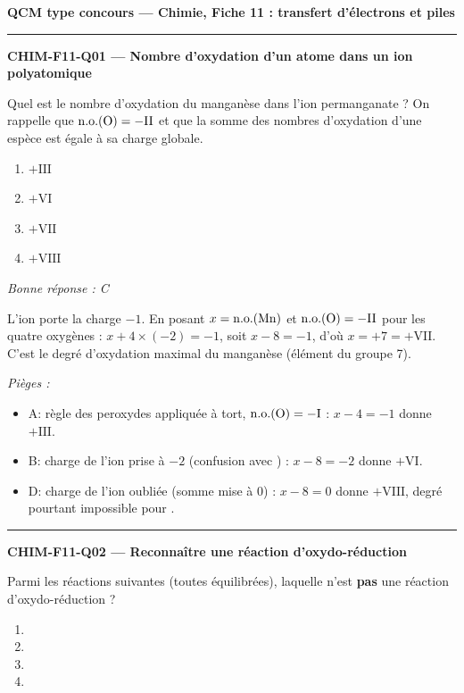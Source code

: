 \documentclass[11pt,a4paper]{article}
\begin{document}
\begin{center}\Large\bfseries QCM type concours --- Chimie, Fiche 11 : transfert d'électrons et piles\end{center}
\vspace{4pt}\hrule\vspace{10pt}
\noindent\textbf{CHIM-F11-Q01 --- Nombre d'oxydation d'un atome dans un ion polyatomique}\par
Quel est le nombre d'oxydation du manganèse dans l'ion permanganate  ? On rappelle que $\mathrm{n.o.}(\ce{O})=-\mathrm{II}$ et que la somme des nombres d'oxydation d'une espèce est égale à sa charge globale.
\begin{enumerate}[label=\Alph*)]
\item $+\mathrm{III}$
\item $+\mathrm{VI}$
\item $+\mathrm{VII}$
\item $+\mathrm{VIII}$
\end{enumerate}
\textit{Bonne réponse : C}\par
L'ion  porte la charge $-1$. En posant $x=\mathrm{n.o.}(\ce{Mn})$ et $\mathrm{n.o.}(\ce{O})=-\mathrm{II}$ pour les quatre oxygènes : $x+4\times(-2)=-1$, soit $x-8=-1$, d'où $x=+7=+\mathrm{VII}$. C'est le degré d'oxydation maximal du manganèse (élément du groupe 7).\par
\textit{Pièges :}
\begin{itemize}
\item A: règle des peroxydes appliquée à tort, $\mathrm{n.o.}(\ce{O})=-\mathrm{I}$ : $x-4=-1$ donne $+\mathrm{III}$.
\item B: charge de l'ion prise à $-2$ (confusion avec ) : $x-8=-2$ donne $+\mathrm{VI}$.
\item D: charge de l'ion oubliée (somme mise à $0$) : $x-8=0$ donne $+\mathrm{VIII}$, degré pourtant impossible pour .
\end{itemize}
\vspace{8pt}\hrule\vspace{8pt}
\noindent\textbf{CHIM-F11-Q02 --- Reconnaître une réaction d'oxydo-réduction}\par
Parmi les réactions suivantes (toutes équilibrées), laquelle n'est \textbf{pas} une réaction d'oxydo-réduction ?
\begin{enumerate}[label=\Alph*)]
\item {}
\item {}
\item {}
\item {}
\end{enumerate}
\end{document}
